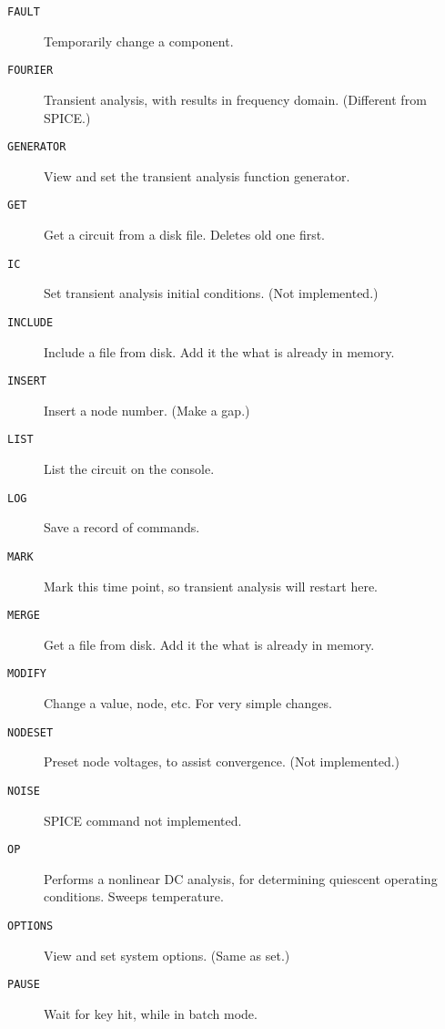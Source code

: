 \begin{description}
\item[{\tt FAULT}] Temporarily change a component.

\item[{\tt FOURIER}] Transient analysis, with results in
frequency domain.  (Different from SPICE.)

\item[{\tt GENERATOR}] View and set the transient analysis function
generator.

\item[{\tt GET}] Get a circuit from a disk file.  Deletes old one first.

\item[{\tt IC}] Set transient analysis initial conditions.
(Not implemented.)

\item[{\tt INCLUDE}] Include a file from disk.  Add it the what is
already in memory.

\item[{\tt INSERT}] Insert a node number.  (Make a gap.)

\item[{\tt LIST}] List the circuit on the console.

\item[{\tt LOG}] Save a record of commands.

\item[{\tt MARK}] Mark this time point, so transient analysis will restart
here.

\item[{\tt MERGE}] Get a file from disk.  Add it the what is already in
memory.

\item[{\tt MODIFY}] Change a value, node, etc.  For very simple changes.

\item[{\tt NODESET}] Preset node voltages, to assist convergence.  (Not
implemented.)

\item[{\tt NOISE}] SPICE command not implemented.

\item[{\tt OP}] Performs a nonlinear DC analysis, for determining quiescent
operating conditions.  Sweeps temperature.

\item[{\tt OPTIONS}] View and set system options.  (Same as set.)

\item[{\tt PAUSE}] Wait for key hit, while in batch mode.


\end{description}
